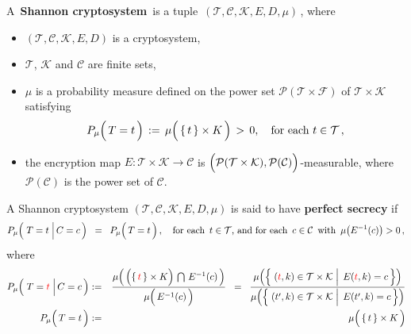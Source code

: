 \begin{definition}
\mbox{}
\vskip 0.1cm
\noindent
A \,\textbf{Shannon cryptosystem}\, is a tuple \,$(\mathcal{T},\mathcal{C},\mathcal{K},E,D,\mu)$\,,
where
\begin{itemize}
\item
	$(\mathcal{T},\mathcal{C},\mathcal{K},E,D)$ is a cryptosystem,
\item
	$\mathcal{T}$, $\mathcal{K}$ and $\mathcal{C}$ are finite sets,
\item
	$\mu$ is a probability measure defined on the power set $\mathcal{P}(\mathcal{T}\times\mathcal{F})$
	of $\mathcal{T}\times\mathcal{K}$ satisfying
	\begin{equation*}
	P_{\mu}\!\left(\,\overset{{\color{white}.}}{T} = t\,\right)
	\, := \,\mu\!\left(\, \{\,t\,\} \overset{{\color{white}.}}{\times} K \,\right)
	\, > \, 0,
	\quad
	\textnormal{for each $t \in \mathcal{T}$}\,,
	\end{equation*}
\item
	the encryption map $E : \mathcal{T} \times \mathcal{K} \longrightarrow \mathcal{C}$ is
	$\left(
	\overset{{\color{white}.}}{\mathcal{P}}(\mathcal{T}\times\mathcal{K}),\mathcal{P}(\mathcal{C})
	\right)$-measurable, where $\mathcal{P}(\mathcal{C})$ is the power set of $\mathcal{C}$.
\end{itemize}
\end{definition}

\vskip 0.5cm

\begin{definition}
\mbox{}
\vskip 0.1cm
\noindent
A Shannon cryptosystem
$(\mathcal{T},\mathcal{C},\mathcal{K},E,D,\mu)$
is said to have \textbf{perfect secrecy} if
\begin{equation*}
P_{\mu}\!\left(\,\left.\overset{{\color{white}.}}{T} = t \;\right\vert C = c\,\right)
\;\; = \;\;
	P_{\mu}\!\left(\,\overset{{\color{white}.}}{T} = t\,\right),
\quad
\textnormal{for each \,$t \in \mathcal{T}$, and for each \,$c \in \mathcal{C}$\, with \,$\mu\!\left(E^{-1}(c)\right) > 0$}\,,
\end{equation*}
where
\begin{eqnarray*}
P_{\mu}\!\left(\,\left.\overset{{\color{white}.}}{T} = {\color{red}t} \;\right\vert C = c\,\right)
& := &
	\dfrac{
		\mu\!\left(\,
			\left(\{\,{\color{red}t}\,\} \overset{{\color{white}.}}{\times} K\right) \,\bigcap\, E^{-1}(c)
			\,\right)
		}{
		\mu\!\left(\, \overset{{\color{white}.}}{E^{-1}}(c) \,\right)
		}
\;\; = \;\;
	\dfrac{
		\mu\!\left(\left\{\,
			\left.
			(\overset{{\color{white}.}}{{\color{red}t}},k) \in \mathcal{T} \times \mathcal{K}
			\;\right\vert\;
			E({\color{red}t},k) = c
			\,\right\}\right)
		}{
		\mu\!\left(\left\{\,
			\left.
			(\overset{{\color{white}.}}{t^{\prime}},k) \in \mathcal{T} \times \mathcal{K}
			\;\right\vert\;
			E(t^{\prime},k) = c
			\,\right\}\right)
		}
\\
P_{\mu}\!\left(\,\overset{{\color{white}.}}{T} = t\,\right)
& := &
	\mu\!\left(\, \{\,t\,\} \overset{{\color{white}.}}{\times} K \,\right)
\end{eqnarray*}
\end{definition}

